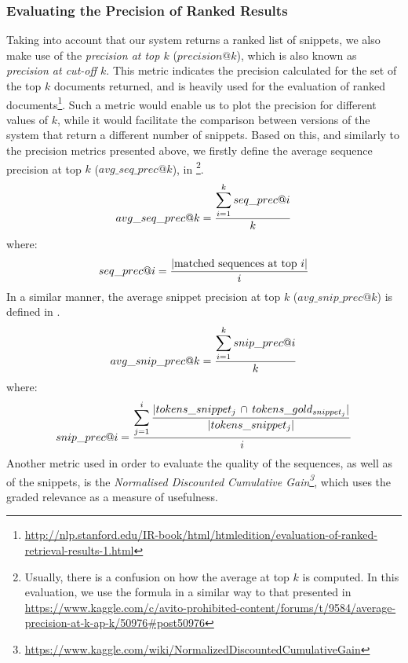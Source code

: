 \subsubsection{Evaluating the Precision of Ranked Results}
\label{subsubsec:evaluation-ranked}

Taking into account that our system returns a ranked list of snippets, we also make use of the \textit{precision at top $k$} ($precision@k$), which is also known as \textit{precision at cut-off $k$}. This metric indicates the precision calculated for the set of the top $k$ documents returned, and is heavily used for the evaluation of ranked documents\footnote{\url{http://nlp.stanford.edu/IR-book/html/htmledition/evaluation-of-ranked-retrieval-results-1.html}}. Such a metric would enable us to plot the precision for different values of $k$, while it would facilitate the comparison between versions of the system that return a different number of snippets. Based on this, and similarly to the precision metrics presented above, we firstly define the average sequence precision at top $k$ ($avg\_seq\_prec@k$), in \footnote{Usually, there is a confusion on how the average at top $k$ is computed. In this evaluation, we use the formula in a similar way to that presented in \url{https://www.kaggle.com/c/avito-prohibited-content/forums/t/9584/average-precision-at-k-ap-k/50976\#post50976}}.
\vspace{1ex}
%
\begin{equation}
 \label{eq:avg-sequence-precision-atk}
 \centering
  avg\_seq\_prec@k = 
  \frac{ \displaystyle\sum_{i=1}^{k}
    seq\_prec@i }
       { k }
\end{equation}
%
where:
\vspace{1.5ex}
%
\begin{equation*}
 \label{eq:sequence-precision-ati}
 \centering
  seq\_prec@i = 
  \frac{ | \text{matched sequences at top $i$} | }
       { i }
 \vspace{1.5ex}
\end{equation*}
%
In a similar manner, the average snippet precision at top $k$ ($avg\_snip\_prec@k$) is defined in .
\vspace{1.5ex}
%
\begin{equation}
 \label{eq:avg-snippet-precision-atk}
 \centering
  avg\_snip\_prec@k = 
  \frac{ \displaystyle\sum_{i=1}^{k}
    snip\_prec@i }
       { k }
 \vspace{1.5ex}
\end{equation}
%
where:
%
\vspace{1.5ex}
\begin{equation*}
 \label{eq:snippet-precision-ati}
 \centering
  snip\_prec@i = 
  \frac{ \displaystyle\sum_{j=1}^{i}
   \frac{ | tokens\_snippet_j\, \cap \, tokens\_gold_{snippet_j} | }
  		{ | tokens\_snippet_j | } }
        { i }
 \vspace{1.5ex}
\end{equation*}
%
Another metric used in order to evaluate the quality of the sequences, as well as of the snippets, is the \textit{Normalised Discounted Cumulative Gain\footnote{\url{https://www.kaggle.com/wiki/NormalizedDiscountedCumulativeGain}}}, which uses the graded relevance as a measure of usefulness. 

